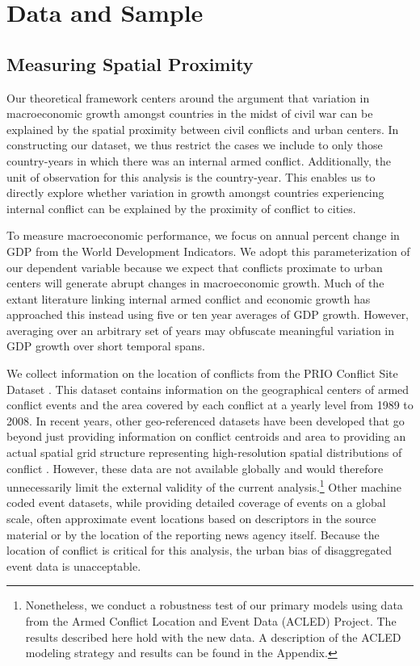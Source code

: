 
\section{Data and Sample}
\label{empirics}

\subsection{Measuring Spatial Proximity}

Our theoretical framework centers around the argument that variation in macroeconomic growth amongst countries in the midst of civil war can be explained by the spatial proximity between civil conflicts and urban centers. In constructing our dataset, we thus restrict the cases we include to only those country-years in which there was an internal armed conflict. Additionally, the unit of observation for this analysis is the country-year. This enables us to directly explore whether variation in growth amongst countries experiencing internal conflict can be explained by the proximity of conflict to cities.

To measure macroeconomic performance, we focus on annual percent change in GDP from the World Development Indicators. We adopt this parameterization of our dependent variable because we expect that conflicts proximate to urban centers will generate abrupt changes in macroeconomic growth. Much of the extant literature linking internal armed conflict and economic growth has approached this instead using five or ten year averages of GDP growth. However, averaging over an arbitrary set of years may obfuscate meaningful variation in GDP growth over short temporal spans.

We collect information on the location of conflicts from the PRIO Conflict Site Dataset \citep{hallberg:2012}. This dataset contains information on the geographical centers of armed conflict events and the area covered by each conflict at a yearly level from 1989 to 2008. In recent years, other geo-referenced datasets have been developed that go beyond just providing information on conflict centroids and area to providing an actual spatial grid structure representing high-resolution spatial distributions of conflict \citep{tollefsen:etal:2012}. However, these data are not available globally and would therefore unnecessarily limit the external validity of the current analysis.\footnote{Nonetheless, we conduct a robustness test of our primary models using data from the Armed Conflict Location and Event Data (ACLED) Project. The results described here hold with the new data. A description of the ACLED modeling strategy and results can be found in the Appendix.} Other machine coded event datasets, while providing detailed coverage of events on a global scale, often approximate event locations based on descriptors in the source material or by the location of the reporting news agency itself. Because the location of conflict is critical for this analysis, the urban bias of disaggregated event data is unacceptable.

